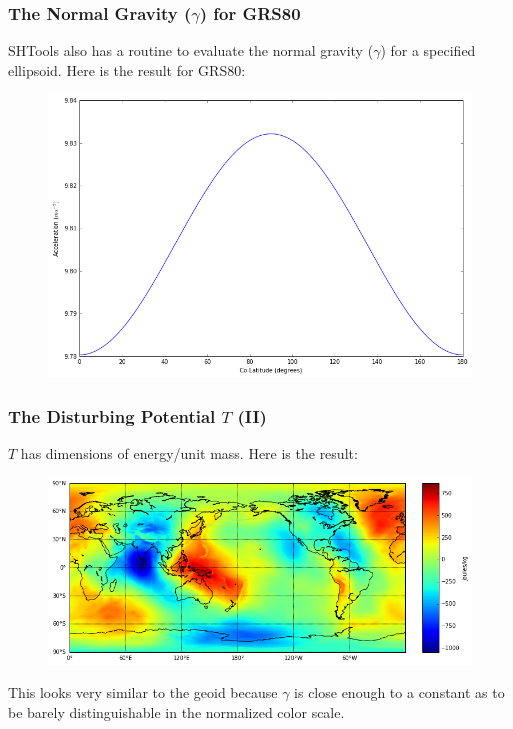 \documentclass[aspectratio=43,mathserif]{beamer}
\begin{document}
\begin{frame}
\frametitle{The Normal Gravity (\(\gamma\)) for GRS80}

SHTools also has a routine to evaluate the normal gravity (\(\gamma\)) for a specified ellipsoid. Here is the result for GRS80:

\begin{figure}
\includegraphics[width=0.8\linewidth]{NormalGravity.png}
\end{figure}

\end{frame}

\begin{frame}
\frametitle{The Disturbing Potential \(T\) (II)}

\(T\) has dimensions of energy/unit mass. Here is the result:

\begin{figure}
\includegraphics[width=0.9\linewidth]{TImage.png}
\end{figure}

This looks very similar to the geoid because \(\gamma\) is close enough to a constant as to be barely distinguishable in the normalized color scale.

\end{frame}
\end{document}
